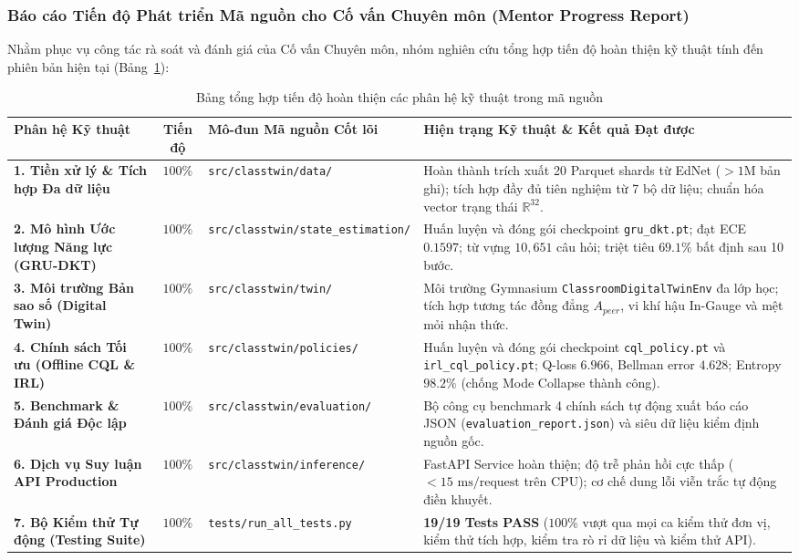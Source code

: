 \subsubsection{Báo cáo Tiến độ Phát triển Mã nguồn cho Cố vấn Chuyên môn (Mentor Progress Report)}
Nhằm phục vụ công tác rà soát và đánh giá của Cố vấn Chuyên môn, nhóm nghiên cứu tổng hợp tiến độ hoàn thiện kỹ thuật tính đến phiên bản hiện tại (Bảng~\ref{tab:code-progress}):

\begin{table}[htbp]
  \centering\small
  \caption{Bảng tổng hợp tiến độ hoàn thiện các phân hệ kỹ thuật trong mã nguồn}\label{tab:code-progress}
  \begin{tabularx}{\textwidth}{p{3.2cm} c p{4.2cm} X}
    \toprule
    \textbf{Phân hệ Kỹ thuật} & \textbf{Tiến độ} & \textbf{Mô-đun Mã nguồn Cốt lõi} & \textbf{Hiện trạng Kỹ thuật \& Kết quả Đạt được} \\
    \midrule
    \textbf{1. Tiền xử lý \& Tích hợp Đa dữ liệu} & $100\%$ & \texttt{src/classtwin/data/} & Hoàn thành trích xuất 20 Parquet shards từ EdNet ($>1\text{M}$ bản ghi); tích hợp đầy đủ tiên nghiệm từ 7 bộ dữ liệu; chuẩn hóa vector trạng thái $\mathbb{R}^{32}$. \\
    \addlinespace
    \textbf{2. Mô hình Ước lượng Năng lực (GRU-DKT)} & $100\%$ & \texttt{src/classtwin/state\_estimation/} & Huấn luyện và đóng gói checkpoint \texttt{gru\_dkt.pt}; đạt ECE $0.1597$; từ vựng $10,651$ câu hỏi; triệt tiêu $69.1\%$ bất định sau 10 bước. \\
    \addlinespace
    \textbf{3. Môi trường Bản sao số (Digital Twin)} & $100\%$ & \texttt{src/classtwin/twin/} & Môi trường Gymnasium \texttt{ClassroomDigitalTwinEnv} đa lớp học; tích hợp tương tác đồng đẳng $A_{peer}$, vi khí hậu In-Gauge và mệt mỏi nhận thức. \\
    \addlinespace
    \textbf{4. Chính sách Tối ưu (Offline CQL \& IRL)} & $100\%$ & \texttt{src/classtwin/policies/} & Huấn luyện và đóng gói checkpoint \texttt{cql\_policy.pt} và \texttt{irl\_cql\_policy.pt}; Q-loss $6.966$, Bellman error $4.628$; Entropy $98.2\%$ (chống Mode Collapse thành công). \\
    \addlinespace
    \textbf{5. Benchmark \& Đánh giá Độc lập} & $100\%$ & \texttt{src/classtwin/evaluation/} & Bộ công cụ benchmark 4 chính sách tự động xuất báo cáo JSON (\texttt{evaluation\_report.json}) và siêu dữ liệu kiểm định nguồn gốc. \\
    \addlinespace
    \textbf{6. Dịch vụ Suy luận API Production} & $100\%$ & \texttt{src/classtwin/inference/} & FastAPI Service hoàn thiện; độ trễ phản hồi cực thấp ($<15\text{ ms/request}$ trên CPU); cơ chế dung lỗi viễn trắc tự động điền khuyết. \\
    \addlinespace
    \textbf{7. Bộ Kiểm thử Tự động (Testing Suite)} & $100\%$ & \texttt{tests/run\_all\_tests.py} & \textbf{19/19 Tests PASS} ($100\%$ vượt qua mọi ca kiểm thử đơn vị, kiểm thử tích hợp, kiểm tra rò rỉ dữ liệu và kiểm thử API). \\
    \bottomrule
  \end{tabularx}
\end{table}

